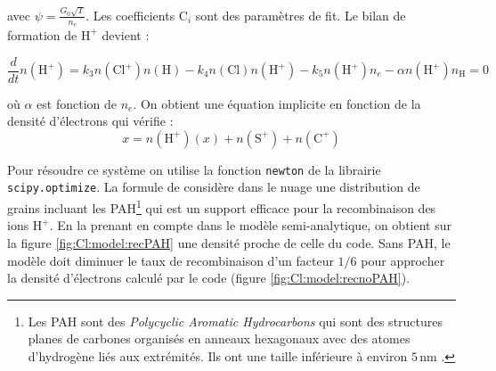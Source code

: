 avec $\psi = \frac{G_0 \sqrt{T}}{n_e}$. Les coefficients $\mathrm{C}_i$ sont des paramètres de fit. Le bilan de formation de $\mathrm{H}^+$ devient : 

\begin{equation}\label{eq:h+}
    \frac{d}{dt}n(\mathrm{H}^+) = k_3n(\mathrm{Cl}^+)n(\mathrm{H}) - k_4n(\mathrm{Cl})n(\mathrm{H}^+) - k_5 n(\mathrm{H}^+)n_e -\alpha n(\mathrm{H}^+)n_{\mathrm{H}} = 0
\end{equation}

où $\alpha$ est fonction de $n_e$. On obtient une équation implicite en fonction de la densité d'électrons qui vérifie :
\begin{equation}
    x = n(\mathrm{H}^+)(x) + n(\mathrm{S}^+)  + n(\mathrm{C}^+)
\end{equation}

Pour résoudre ce système on utilise la fonction \texttt{newton} de la librairie \texttt{scipy.optimize}. La formule de \cite{Weingartner_2001} considère dans le nuage une distribution de grains incluant les PAH\footnote{Les PAH sont des \textit{Polycyclic Aromatic Hydrocarbons} qui sont des structures planes de carbones organisés en anneaux hexagonaux avec des atomes d'hydrogène liés aux extrémités. Ils ont une taille inférieure à environ $5\,\mathrm{nm}$ \cite{DraineBook}.} qui est un support efficace pour la recombinaison des ions $\mathrm{H}^+$. En la prenant en compte dans le modèle semi-analytique, on obtient sur la figure \ref{fig:Cl:model:recPAH} une densité proche de celle du code. Sans PAH, le modèle doit diminuer le taux de recombinaison d'un facteur $1/6$ pour approcher la densité d'électrons calculé par le code (figure \ref{fig:Cl:model:recnoPAH}).




